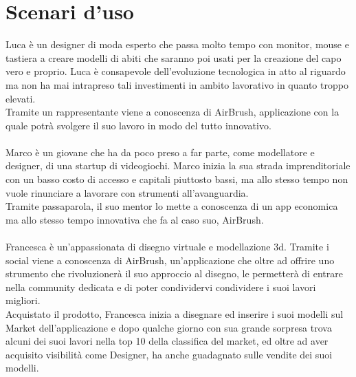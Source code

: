 \documentclass[11pt,fleqn]{book} %
\begin{document}
\section{Scenari d'uso}
Luca è un designer di moda esperto che passa molto tempo con monitor, mouse e tastiera a creare modelli di abiti che saranno poi usati per la creazione del capo vero e proprio. Luca è consapevole dell’evoluzione tecnologica in atto al riguardo ma non ha mai intrapreso tali investimenti in ambito lavorativo in quanto troppo elevati. \\
Tramite un rappresentante viene a conoscenza di AirBrush, applicazione con la quale potrà svolgere il suo lavoro in modo del tutto innovativo.
\\\\
Marco è un giovane che ha da poco preso a far parte, come modellatore e designer, di una startup di videogiochi.
Marco inizia la sua strada imprenditoriale con un basso costo di accesso e capitali piuttosto bassi, ma allo stesso tempo non vuole rinunciare a lavorare con strumenti all'avanguardia. \\
Tramite passaparola, il suo mentor lo mette a conoscenza di un app economica ma allo stesso tempo innovativa che fa al caso suo, AirBrush.
\\\\
Francesca è un'appassionata di disegno virtuale e modellazione 3d. Tramite i social viene a conoscenza di AirBrush, un’applicazione che oltre ad offrire uno strumento che rivoluzionerà il suo approccio al disegno, le permetterà di entrare nella community dedicata e di poter condividervi condividere i suoi lavori migliori. \\Acquistato il prodotto, Francesca inizia a disegnare ed inserire i suoi modelli sul Market dell'applicazione e dopo qualche giorno con sua grande sorpresa trova alcuni dei suoi lavori nella top 10 della classifica del market, ed oltre ad aver acquisito visibilità come Designer, ha anche guadagnato sulle vendite dei suoi modelli.


\newpage
\end{document}
